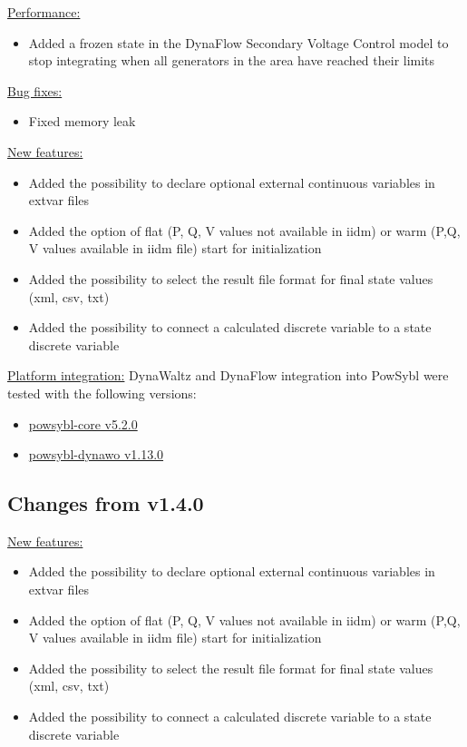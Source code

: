 \documentclass[a4paper, 12pt]{report}
\begin{document}
\underline{Performance:}

\begin{itemize}
\item Added a frozen state in the DynaFlow Secondary Voltage Control model to stop integrating when all generators in the area have reached their limits
\end{itemize}

\underline{Bug fixes:}

\begin{itemize}
\item Fixed memory leak
\end{itemize}

\underline{New features:}
\begin{itemize}
\item Added the possibility to declare optional external continuous variables in extvar files
\item Added the option of flat (P, Q, V values not available in iidm) or warm (P,Q, V values available in iidm file) start for initialization
\item Added the possibility to select the result file format for final state values (xml, csv, txt)
\item Added the possibility to connect a calculated discrete variable to a state discrete variable
\end{itemize}

\underline{Platform integration:}
DynaWaltz and DynaFlow integration into PowSybl were tested with the following versions:
\begin{itemize}
\item \href{https://github.com/powsybl/powsybl-core/releases/tag/v5.2.0}{powsybl-core v5.2.0}
\item \href{https://github.com/powsybl/powsybl-dynawo/releases/tag/v1.13.0}{powsybl-dynawo v1.13.0}
\end{itemize}


\subsection{Changes from v1.4.0}

\underline{New features:}
\begin{itemize}
\item Added the possibility to declare optional external continuous variables in extvar files
\item Added the option of flat (P, Q, V values not available in iidm) or warm (P,Q, V values available in iidm file) start for initialization
\item Added the possibility to select the result file format for final state values (xml, csv, txt)
\item Added the possibility to connect a calculated discrete variable to a state discrete variable
\end{itemize}
\end{document}
